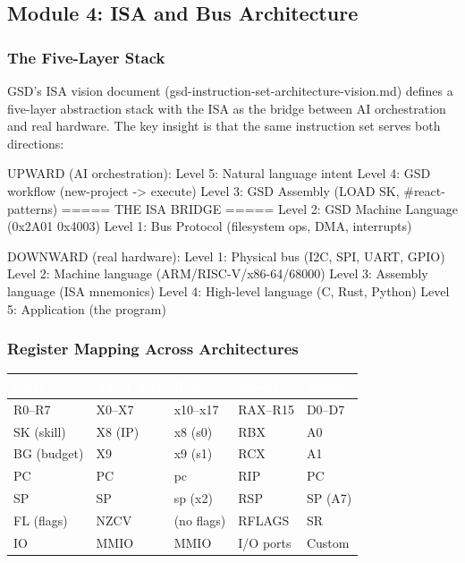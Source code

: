 \documentclass[11pt,letterpaper]{article}
\newcommand{\tableheader}[1]{\textbf{\sffamily\textcolor{white}{#1}}}
\begin{document}
\subsection{Module 4: ISA and Bus Architecture}

\subsubsection{The Five-Layer Stack}

GSD's ISA vision document (gsd-instruction-set-architecture-vision.md) defines a five-layer abstraction stack with the ISA as the bridge between AI orchestration and real hardware. The key insight is that the same instruction set serves both directions:

\begin{asciibox}
UPWARD (AI orchestration):
  Level 5: Natural language intent
  Level 4: GSD workflow (new-project -> execute)
  Level 3: GSD Assembly (LOAD SK, #react-patterns)
  ===== THE ISA BRIDGE =====
  Level 2: GSD Machine Language (0x2A01 0x4003)
  Level 1: Bus Protocol (filesystem ops, DMA, interrupts)

DOWNWARD (real hardware):
  Level 1: Physical bus (I2C, SPI, UART, GPIO)
  Level 2: Machine language (ARM/RISC-V/x86-64/68000)
  Level 3: Assembly language (ISA mnemonics)
  Level 4: High-level language (C, Rust, Python)
  Level 5: Application (the program)
\end{asciibox}

\subsubsection{Register Mapping Across Architectures}

\begin{center}
\begin{tabularx}{\textwidth}{C{1.5cm}C{2cm}C{2cm}C{2cm}C{1.5cm}}
\toprule
{}
\tableheader{GSD} & \tableheader{ARM A64} & \tableheader{RISC-V} & \tableheader{x86-64} & \tableheader{68000} \\
\midrule
R0--R7 & X0--X7 & x10--x17 & RAX--R15 & D0--D7 \\
SK (skill) & X8 (IP) & x8 (s0) & RBX & A0 \\
BG (budget) & X9 & x9 (s1) & RCX & A1 \\
PC & PC & pc & RIP & PC \\
SP & SP & sp (x2) & RSP & SP (A7) \\
FL (flags) & NZCV & (no flags) & RFLAGS & SR \\
IO & MMIO & MMIO & I/O ports & Custom \\
\bottomrule
\end{tabularx}
\end{center}
\end{document}
